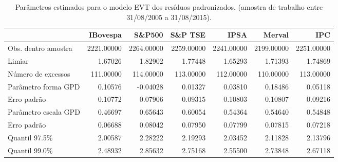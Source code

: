\begin{table}[H]
\centering
\caption{Parâmetros estimados para o modelo EVT dos resíduos padronizados. 
               (amostra de trabalho entre 31/08/2005 a 31/08/2015).} 
\label{tab:evtcoef}
\begin{tabular}{lrrrrrr}
  \hline
 & IBovespa & S\&P500 & S\&P TSE & IPSA & Merval & IPC \\ 
  \hline
Obs. dentro amostra & 2221.00000 & 2264.00000 & 2259.00000 & 2241.00000 & 2199.00000 & 2251.00000 \\ 
  Limiar & 1.67026 & 1.82902 & 1.77448 & 1.65293 & 1.71393 & 1.74869 \\ 
  Número de excessos & 111.00000 & 114.00000 & 113.00000 & 112.00000 & 110.00000 & 113.00000 \\ 
  Parâmetro forma GPD & 0.10576 & -0.04028 & 0.01327 & 0.03810 & 0.18486 & 0.05118 \\ 
  Erro padrão & 0.10772 & 0.07906 & 0.09315 & 0.10803 & 0.10807 & 0.09216 \\ 
  Parâmetro escala GPD & 0.46697 & 0.65643 & 0.60054 & 0.54364 & 0.54640 & 0.54848 \\ 
  Erro padrão & 0.06688 & 0.08042 & 0.07950 & 0.07799 & 0.07815 & 0.07218 \\ 
  Quantil 97.5\% & 2.00587 & 2.28222 & 2.19293 & 2.03452 & 2.11828 & 2.13796 \\ 
  Quantil 99.0\% & 2.48932 & 2.85632 & 2.75168 & 2.55500 & 2.73848 & 2.67118 \\ 
   \hline
\end{tabular}
\end{table}
